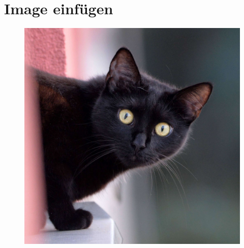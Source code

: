 \documentclass{scrarticle}
\begin{document}
	
 	\section{Image einfügen}
	\begin{figure}[h!hbt]
		\includegraphics[width=\linewidth]{./Abbildungen/Beispiel.jpg}
	\end{figure}	
	\newpage
	
\end{document}
